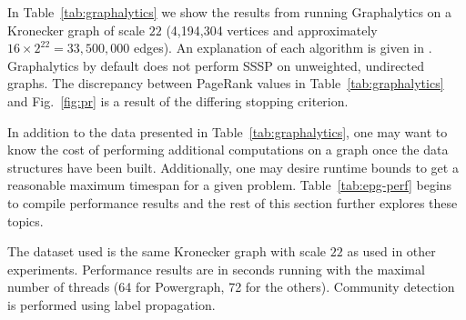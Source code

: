 \documentclass[conference]{IEEEtran}
\begin{document}
In Table~\ref{tab:graphalytics} we show the results from running Graphalytics on a Kronecker graph of scale $22$ (4,194,304 vertices and approximately $16 \times 2^22 = 33,500,000$ edges). An explanation of each algorithm is given in \cite{Iosup:2016:Graphalyticstech}. Graphalytics by default does not perform SSSP on unweighted, undirected graphs. The discrepancy between PageRank values in Table~\ref{tab:graphalytics} and Fig.~\ref{fig:pr} is a result of the differing stopping criterion.

In addition to the data presented in Table~\ref{tab:graphalytics}, one may want to know the cost of performing additional computations on a graph once the data structures have been built. Additionally, one may desire runtime bounds to get a reasonable maximum timespan for a given problem. Table~\ref{tab:epg-perf} begins to compile performance results and the rest of this section further explores these topics.


\begin{table}
	\caption{The dataset used is the same Kronecker graph with scale $22$ as used in other experiments. Performance results are in seconds running with the maximal number of threads (64 for Powergraph, 72 for the others). Community detection is performed using label propagation.}
	\centering
	\label{tab:graphalytics}
\end{table}
\end{document}
